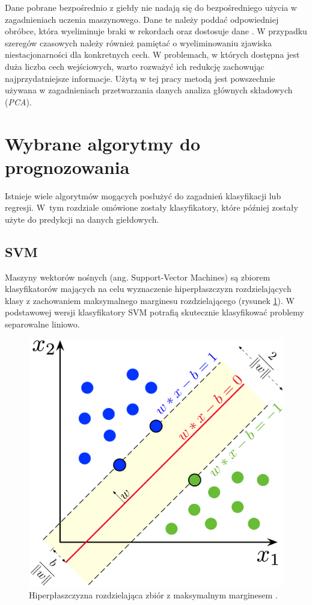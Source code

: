 \documentclass[a4paper, twoside, 11pt, openright]{article}
\begin{document}
Dane pobrane bezpośrednio z giełdy nie nadają się do bezpośredniego użycia w zagadnieniach uczenia maszynowego. Dane te należy poddać odpowiedniej obróbce, która wyeliminuje braki w rekordach oraz dostosuje dane . W przypadku szeregów czasowych należy również pamiętać o wyeliminowaniu zjawiska niestacjonarności dla konkretnych cech.  W problemach, w których dostępna jest duża liczba cech wejściowych, warto rozważyć ich redukcję zachowując najprzydatniejsze informacje. Użytą w tej pracy metodą jest powszechnie używana w zagadnieniach przetwarzania danych analiza głównych składowych (\textit{PCA}). 

\newpage

\section{Wybrane algorytmy do prognozowania}

Istnieje wiele algorytmów mogących posłużyć do zagadnień klasyfikacji lub regresji. W~tym rozdziale omówione zostały klasyfikatory, które później zostały użyte do predykcji na danych giełdowych.

\subsection{SVM}

Maszyny wektorów nośnych (ang. Support-Vector Machines)\cite{svm} są zbiorem klasyfikatorów mających na celu wyznaczenie hiperpłaszczyzn rozdzielających klasy z zachowaniem maksymalnego marginesu rozdzielającego (rysunek \ref{img:wiki_svm}). W podstawowej wersji klasyfikatory SVM potrafią skutecznie klasyfikować problemy separowalne liniowo.


\begin{figure}[H]
\centering \includegraphics[scale=0.9]{img/svm.png}
\caption{Hiperpłaszczyzna rozdzielająca zbiór z maksymalnym marginesem \cite{wikisvm}.}
\label{img:wiki_svm}
\end{figure}
\end{document}
